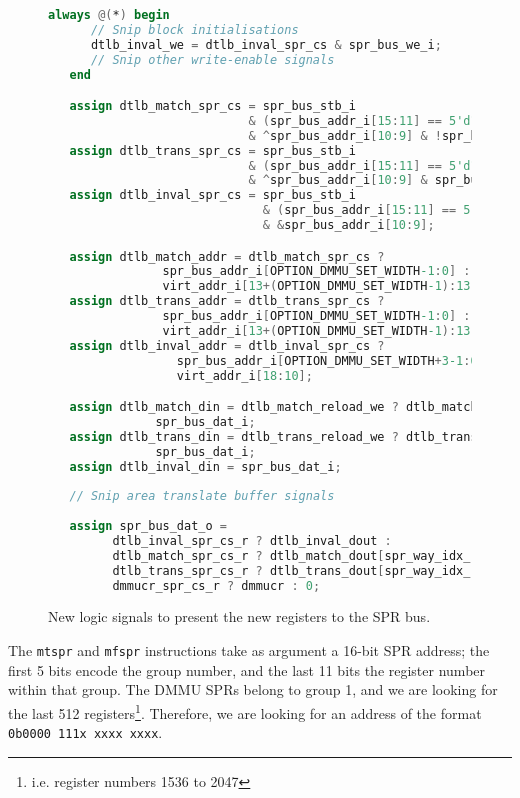 \begin{figure}[t]
  \centering
  \begin{lstlisting}[language=Verilog]
   always @(*) begin
      // Snip block initialisations
      dtlb_inval_we = dtlb_inval_spr_cs & spr_bus_we_i;
      // Snip other write-enable signals
   end

   assign dtlb_match_spr_cs = spr_bus_stb_i
                            & (spr_bus_addr_i[15:11] == 5'd1)
                            & ^spr_bus_addr_i[10:9] & !spr_bus_addr_i[7];
   assign dtlb_trans_spr_cs = spr_bus_stb_i
                            & (spr_bus_addr_i[15:11] == 5'd1)
                            & ^spr_bus_addr_i[10:9] & spr_bus_addr_i[7];
   assign dtlb_inval_spr_cs = spr_bus_stb_i
                              & (spr_bus_addr_i[15:11] == 5'd1)
                              & &spr_bus_addr_i[10:9];

   assign dtlb_match_addr = dtlb_match_spr_cs ?
			    spr_bus_addr_i[OPTION_DMMU_SET_WIDTH-1:0] :
			    virt_addr_i[13+(OPTION_DMMU_SET_WIDTH-1):13];
   assign dtlb_trans_addr = dtlb_trans_spr_cs ?
			    spr_bus_addr_i[OPTION_DMMU_SET_WIDTH-1:0] :
			    virt_addr_i[13+(OPTION_DMMU_SET_WIDTH-1):13];
   assign dtlb_inval_addr = dtlb_inval_spr_cs ?
			      spr_bus_addr_i[OPTION_DMMU_SET_WIDTH+3-1:0] :
			      virt_addr_i[18:10];

   assign dtlb_match_din = dtlb_match_reload_we ? dtlb_match_reload_din :
			   spr_bus_dat_i;
   assign dtlb_trans_din = dtlb_trans_reload_we ? dtlb_trans_reload_din :
			   spr_bus_dat_i;
   assign dtlb_inval_din = spr_bus_dat_i;
   
   // Snip area translate buffer signals
   
   assign spr_bus_dat_o =
         dtlb_inval_spr_cs_r ? dtlb_inval_dout :
         dtlb_match_spr_cs_r ? dtlb_match_dout[spr_way_idx_r] :
         dtlb_trans_spr_cs_r ? dtlb_trans_dout[spr_way_idx_r] :
         dmmucr_spr_cs_r ? dmmucr : 0;
  \end{lstlisting}
  \caption{New logic signals to present the new registers to the SPR bus.}
  \label{fig:spr_logic}
\end{figure}

The \texttt{mtspr} and \texttt{mfspr} instructions take as argument a 16-bit SPR address; the first 5 bits encode the group number, and the last 11 bits the register number within that group. The DMMU SPRs belong to group 1, and we are looking for the last 512 registers\footnote{i.e. register numbers 1536 to 2047}. Therefore, we are looking for an address of the format \texttt{0b0000 111x xxxx xxxx}.

